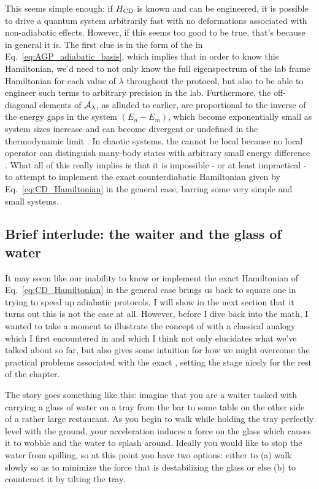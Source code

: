     This seems simple enough: if $H_{\rm CD}$ is known and can be engineered, it is possible to drive a quantum system arbitrarily fast with no deformations associated with non-adiabatic effects. However, if this seems too good to be true, that's because in general it is. The first clue is in the form of the  in Eq.~\eqref{eq:AGP_adiabatic_basis}, which implies that in order to know this  Hamiltonian, we'd need to not only know the full eigenspectrum of the lab frame Hamiltonian for each value of $\lambda$ throughout the protocol, but also to be able to engineer such terms to arbitrary precision in the lab. Furthermore, the off-diagonal elements of $\mathcal{A}_{\lambda}$, as alluded to earlier, are proportional to the inverse of the energy gaps in the system $(E_n - E_m)$, which become exponentially small as system sizes increase and can become divergent or undefined in the thermodynamic limit \cite{kolodrubetz_geometry_2017, jarzynski_geometric_1995}. In chaotic systems, the  cannot be local because no local operator can distinguish many-body states with arbitrary small energy difference \cite{dalessio_quantum_2016}. What all of this really implies is that it is impossible - or at least impractical - to attempt to implement the exact counterdiabatic Hamiltonian given by Eq.~\eqref{eq:CD_Hamiltonian} in the general case, barring some very simple and small systems.

    \subsection{Brief interlude: the waiter and the glass of water}

    It may seem like our inability to know or implement the exact  Hamiltonian of Eq.~\eqref{eq:CD_Hamiltonian} in the general case brings us back to square one in trying to speed up adiabatic protocols. I will show in the next section that it turns out this is not the case at all. However, before I dive back into the math, I wanted to take a moment to illustrate the concept of  with a classical analogy which I first encountered in \cite{sels_minimizing_2017} and which I think not only elucidates what we've talked about so far, but also gives some intuition for how we might overcome the practical problems associated with the exact , setting the stage nicely for the rest of the chapter.
    
    The story goes something like this: imagine that you are a waiter tasked with carrying a glass of water on a tray from the bar to some table on the other side of a rather large restaurant. As you begin to walk while holding the tray perfectly level with the ground, your acceleration induces a force on the glass which causes it to wobble and the water to splash around. Ideally you would like to stop the water from spilling, so at this point you have two options: either to (a) walk slowly so as to minimize the force that is destabilizing the glass or else (b) to counteract it by tilting the tray. 

